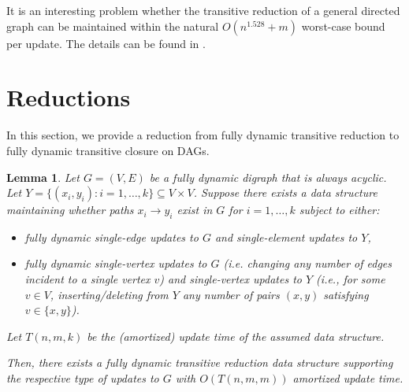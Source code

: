 \documentclass[11pt]{article}
\newtheorem{lemma}[theorem]{Lemma}
\newcommand{\arxivVsConference}[2]{#1}
\begin{document}
It is an interesting problem whether the transitive reduction of a general directed graph can be maintained within the natural $O(n^{1.528}+m)$ worst-case bound per update. The details can be found in \arxivVsConference{}{Appendix~\ref{sec:app_algebraic_general}}.
 


\section{Reductions}\label{sec:reduction}


In this section, we provide a reduction from fully dynamic transitive reduction to fully dynamic transitive closure on DAGs.


\begin{lemma}\label{l:dag-reduction}
Let $G=(V,E)$ be a fully dynamic digraph that is always acyclic. Let\linebreak
${Y=\{(x_i,y_i):i=1,\ldots,k\}\subseteq V\times V}$.
Suppose there exists a data structure maintaining whether paths $x_i\to y_i$
exist in $G$ for $i=1,\ldots,k$ subject to either:
\begin{itemize}
    \item fully dynamic single-edge updates to $G$ and single-element updates to $Y$,
    \item fully dynamic single-vertex updates to $G$ (i.e. changing any number of edges incident to a single vertex $v$) and single-vertex updates to $Y$ (i.e., for some $v\in V$, inserting/deleting from $Y$ any number of pairs $(x,y)$ satisfying
    $v\in \{x,y\}$).
\end{itemize}
Let $T(n,m,k)$ be the (amortized) update time of the assumed data structure.

Then, there exists a fully dynamic transitive reduction data structure supporting
the respective type of updates to $G$ with $O(T(n,m,m))$ amortized update time.
\end{lemma}
\end{document}
